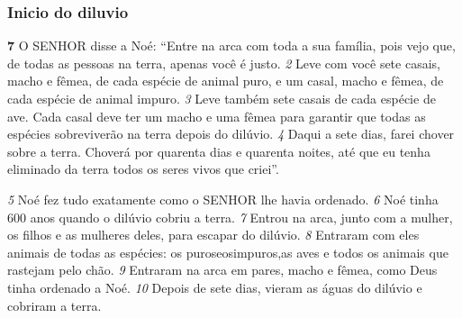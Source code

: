 \bigskip
\subsubsection*{Inicio do diluvio}


\textbf{\large 7}
 O SENHOR disse a Noé: “Entre na arca com toda a sua família, pois vejo que, de todas as pessoas na terra, apenas você é justo. 
\textit{\tiny 2}
 Leve com você sete casais, macho e fêmea, de cada espécie de animal puro, e um casal, macho e fêmea, de cada espécie de animal impuro. 
\textit{\tiny 3}
 Leve também sete casais de cada espécie de ave. Cada casal deve ter um macho e uma fêmea para garantir que todas as espécies sobreviverão na terra depois do dilúvio. 
\textit{\tiny 4}
 Daqui a sete dias, farei chover sobre a terra. Choverá por quarenta dias e quarenta noites, até que eu tenha eliminado da terra todos os seres vivos que criei”.



\bigskip
\textit{\tiny 5}
 Noé fez tudo exatamente como o SENHOR lhe havia ordenado. 
\textit{\tiny 6}
 Noé tinha 600 anos quando o dilúvio cobriu a terra. 
\textit{\tiny 7}
 Entrou na arca, junto com a mulher, os filhos e as mulheres deles, para escapar do dilúvio. 
\textit{\tiny 8}
 Entraram com eles animais de todas as espécies: os puroseosimpuros,as aves e todos os animais que rastejam pelo chão. 
\textit{\tiny 9}
 Entraram na arca em pares, macho e fêmea, como Deus tinha ordenado a Noé. 
\textit{\tiny 10}
 Depois de sete dias, vieram as águas do dilúvio e cobriram a terra.



